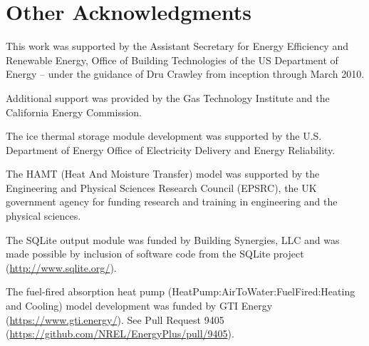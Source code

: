 \section{Other Acknowledgments}\label{other-acknowledgments}

This work was supported by the Assistant Secretary for Energy Efficiency and Renewable Energy, Office of Building Technologies of the US Department of Energy -- under the guidance of Dru Crawley from inception through March 2010.

Additional support was provided by the Gas Technology Institute and the California Energy Commission.

The ice thermal storage module development was supported by the U.S. Department of Energy Office of Electricity Delivery and Energy Reliability.

The HAMT (Heat And Moisture Transfer) model was supported by the Engineering and Physical Sciences Research Council (EPSRC), the UK government agency for funding research and training in engineering and the physical sciences.

The SQLite output module was funded by Building Synergies, LLC and was made possible by inclusion of software code from the SQLite project (\url{http://www.sqlite.org/}).

The fuel-fired absorption heat pump (HeatPump:AirToWater:FuelFired:Heating and Cooling) model development was funded by GTI Energy (\url{https://www.gti.energy/}). See Pull Request 9405 (\url{https://github.com/NREL/EnergyPlus/pull/9405}).